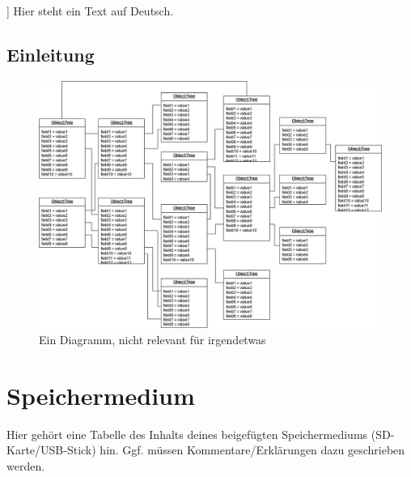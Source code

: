 \documentclass[
    german=true,
    thesistype=dissertation,
    nolistoffigures,
    nolistoftables,
]{tubsthesis}
\begin{document}
    \thesisabstract[%
        This is an english text.\\
        \lipsum[1-2]
    ]{%
        Hier steht ein Text auf Deutsch.\\
        \lipsum[3-4]
    }
    
    
    \begin{thesis}

        \chapter{Einleitung}

        \lipsum[1-3]

        \begin{figure}
        \centering
        \includegraphics[width=\textwidth]{images/example_diagram.png}
        \caption{Ein Diagramm, nicht relevant für irgendetwas~\cite{lisa}}
        \label{fig:inga}
        \end{figure}

        \lipsum[4-7]

    \end{thesis}

    \chapter{Speichermedium}
    Hier gehört eine Tabelle des Inhalts deines beigefügten Speichermediums (SD-Karte/USB-Stick) hin.
    Ggf. müssen Kommentare/Erklärungen dazu geschrieben werden.
\end{document}
